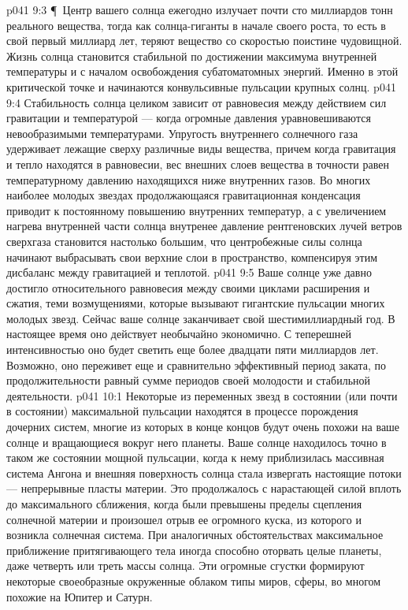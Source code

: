 \vs p041 9:3 \P\ Центр вашего солнца ежегодно излучает почти сто миллиардов тонн реального вещества, тогда как солнца\hyp{}гиганты в начале своего роста, то есть в свой первый миллиард лет, теряют вещество со скоростью поистине чудовищной. Жизнь солнца становится стабильной по достижении максимума внутренней температуры и с началом освобождения субатоматомных энергий. Именно в этой критической точке и начинаются конвульсивные пульсации крупных солнц.
\vs p041 9:4 Стабильность солнца целиком зависит от равновесия между действием сил гравитации и температурой --- когда огромные давления уравновешиваются невообразимыми температурами. Упругость внутреннего солнечного газа удерживает лежащие сверху различные виды вещества, причем когда гравитация и тепло находятся в равновесии, вес внешних слоев вещества в точности равен температурному давлению находящихся ниже внутренних газов. Во многих наиболее молодых звездах продолжающаяся гравитационная конденсация приводит к постоянному повышению внутренних температур, а с увеличением нагрева внутренней части солнца внутренее давление рентгеновских лучей ветров сверхгаза становится настолько большим, что центробежные силы солнца начинают выбрасывать свои верхние слои в пространство, компенсируя этим дисбаланс между гравитацией и теплотой.
\vs p041 9:5 Ваше солнце уже давно достигло относительного равновесия между своими циклами расширения и сжатия, теми возмущениями, которые вызывают гигантские пульсации многих молодых звезд. Сейчас ваше солнце заканчивает свой шестимиллиардный год. В настоящее время оно действует необычайно экономично. С теперешней интенсивностью оно будет светить еще более двадцати пяти миллиардов лет. Возможно, оно переживет еще и сравнительно эффективный период заката, по продолжительности равный сумме периодов своей молодости и стабильной деятельности.
\vs p041 10:1 Некоторые из переменных звезд в состоянии (или почти в состоянии) максимальной пульсации находятся в процессе порождения дочерних систем, многие из которых в конце концов будут очень похожи на ваше солнце и вращающиеся вокруг него планеты. Ваше солнце находилось точно в таком же состоянии мощной пульсации, когда к нему приблизилась массивная система Ангона и внешняя поверхность солнца стала извергать настоящие потоки --- непрерывные пласты материи. Это продолжалось с нарастающей силой вплоть до максимального сближения, когда были превышены пределы сцепления солнечной материи и произошел отрыв ее огромного куска, из которого и возникла солнечная система. При аналогичных обстоятельствах максимальное приближение притягивающего тела иногда способно оторвать целые планеты, даже четверть или треть массы солнца. Эти огромные сгустки формируют некоторые своеобразные окруженные облаком типы миров, сферы, во многом похожие на Юпитер и Сатурн.
